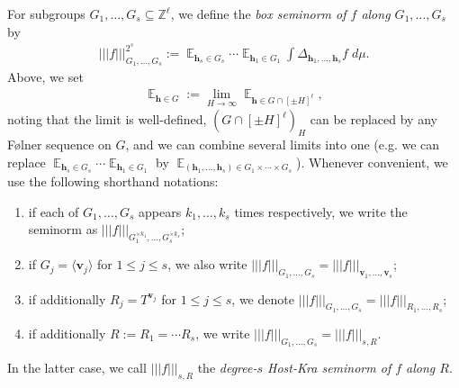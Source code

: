 \documentclass[11pt]{amsart}
\theoremstyle{definition}
\DeclareMathOperator*{\E}{\mathbb{E}}
\newcommand{\Z}{{\mathbb Z}}
\newcommand{\bh}{{\mathbf{h}}}
\newcommand{\bv}{{\mathbf{v}}}
\newcommand{\nnorm}[1]{\lvert\!|\!| #1|\!|\!\rvert}
\newcommand{\1}{{\mathbf{1}}}
\begin{document}

For subgroups $G_1, \ldots, G_s\subseteq\Z^\ell$, we define the \emph{box seminorm of $f$ along $G_1, \ldots, G_s$} by 
\begin{align}\label{E: box seminorm}
	\nnorm{f}_{G_1, \ldots, G_s}^{2^{s}}:=  \E_{\bh_s\in G_s}\cdots \E_{\bh_1\in G_1}\int \Delta_{\bh_1, \ldots, \bh_s}f\; d\mu.
\end{align}
Above, we set
\begin{align*}
    \E_{\bh\in G} := \lim_{H\to\infty}\E_{\bh\in G\cap[\pm H]^\ell},
\end{align*}
noting that the limit is well-defined, $(G\cap [\pm H]^\ell)_H$ can be replaced by any F{\o}lner sequence on $G$, and we can combine several limits into one (e.g. we can replace $\E_{\bh_s\in G_s}\cdots \E_{\bh_1\in G_1}$ by $\E_{(\bh_1, \ldots, \bh_s)\in G_1\times \cdots \times G_s}$). Whenever convenient, we use the following shorthand notations:
\begin{enumerate}
    \item if each of $G_1, \ldots, G_s$ appears $k_1, \ldots, k_s$ times respectively, we write the seminorm as $\nnorm{f}_{G_1^{\times k_1}, \ldots, G_s^{\times k_s}}$;
    \item if $G_j = \langle \bv_j\rangle $ for $1\leq j\leq s$, we also write $\nnorm{f}_{G_1, \ldots, G_s} = \nnorm{f}_{\bv_1, \ldots, \bv_s}$;
    \item if additionally $R_j = T^{\bv_j}$ for $1\leq j\leq s$, we denote $\nnorm{f}_{G_1, \ldots, G_s} = \nnorm{f}_{R_1, \ldots, R_s}$;
    \item if additionally $R:=R_1 = \cdots R_s$, we write $\nnorm{f}_{G_1, \ldots, G_s} = \nnorm{f}_{s, R}$.
\end{enumerate}
In the latter case, we call $\nnorm{f}_{s, R}$ the \emph{degree-$s$ Host-Kra seminorm of $f$ along $R$}.
\end{document}
